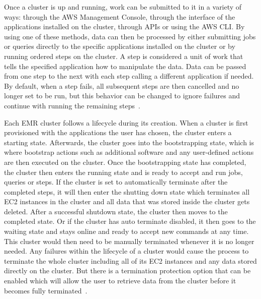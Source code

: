 Once a cluster is up and running, work can be submitted to it in a variety of ways: through the AWS Management Console, through the interface of the applications installed on the cluster, through APIs or using the AWS CLI. By using one of these methods, data can then be processed by either submitting jobs or queries directly to the specific applications installed on the cluster or by running ordered steps on the cluster. A step is considered a unit of work that tells the specified application how to manipulate the data. Data can be passed from one step to the next with each step calling a different application if needed. By default, when a step fails, all subsequent steps are then cancelled and no longer set to be run, but this behavior can be changed to ignore failures and continue with running the remaining steps~\cite{hid-sp18-521-amazonemr-overview}. 

Each EMR cluster follows a lifecycle during its creation. When a cluster is first provisioned with the applications the user has chosen, the cluster enters a starting state. Afterwards, the cluster goes into the bootstrapping state, which is where bootstrap actions such as additional software and any user-defined actions are then executed on the cluster. Once the bootstrapping state has completed, the cluster then enters the running state and is ready to accept and run jobs, queries or steps. If the cluster is set to automatically terminate after the completed steps, it will then enter the shutting down state which terminates all EC2 instances in the cluster and all data that was stored inside the cluster gets deleted. After a successful shutdown state, the cluster then moves to the completed state. Or if the cluster has auto terminate disabled, it then goes to the waiting state and stays online and ready to accept new commands at any time. This cluster would then need to be manually terminated whenever it is no longer needed. Any failures within the lifecycle of a cluster would cause the process to terminate the whole cluster including all of its EC2 instances and any data stored directly on the cluster. But there is a termination protection option that can be enabled which will allow the user to retrieve data from the cluster before it becomes fully terminated~\cite{hid-sp18-521-amazonemr-overview}. 

